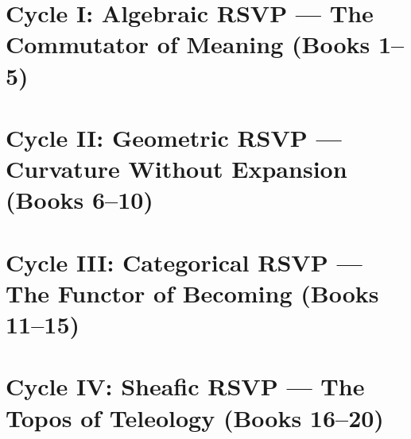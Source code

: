 



\frontmatter
\maketitle
\tableofcontents

\mainmatter

\part{Cycle I: Algebraic RSVP — The Commutator of Meaning (Books 1--5)}


\part{Cycle II: Geometric RSVP — Curvature Without Expansion (Books 6--10)}


\part{Cycle III: Categorical RSVP — The Functor of Becoming (Books 11--15)}


\part{Cycle IV: Sheafic RSVP — The Topos of Teleology (Books 16--20)}


\appendix




